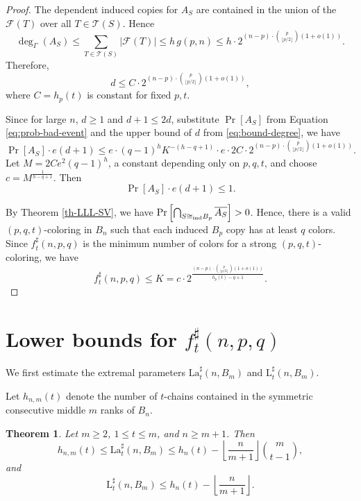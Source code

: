 \documentclass[twoside,12pt]{article}
\newcommand{\flr}[1]{\left\lfloor #1 \right\rfloor}
\newcommand{\floor}[1]{\flr{#1}}
\newtheorem{theorem}{Theorem}[section]
\newcommand{\LaT}{\mathrm{La}}
\newcommand{\LT}{\mathrm{L}}
\begin{document}
\begin{proof}
The dependent induced copies for $A_S$ are contained in the union of the \(\mathcal{F}(T)\) over all $T\in \mathcal T(S)$. Hence
\[
\operatorname{deg}_{\Gamma}(A_S)
\leq \sum_{T \in \mathcal{T}(S)} |\mathcal{F}(T)|
\leq h\, g(p,n)
\leq h \cdot 2^{(n - p) \cdot \binom{p}{\lfloor p/2 \rfloor}(1+o(1))}.
\]
Therefore,
\begin{equation}\label{eq:bound-degree}
d \leq C \cdot 2^{(n - p) \cdot \binom{p}{\lfloor p/2 \rfloor}(1+o(1))},
\end{equation}
where \(C = h_p(t)\) is constant for fixed \(p,t\).

Since for large \(n\), \(d \geq 1\) and \(d + 1 \leq 2d\), substitute \(\Pr[A_S]\) from Equation \eqref{eq:prob-bad-event} and the upper bound of \(d\) from \eqref{eq:bound-degree}, we have
$$
\Pr[A_S] \cdot e(d + 1)\leq e \cdot (q-1)^h K^{-(h - q + 1)} \cdot e \cdot 2 C \cdot 2^{(n - p) \cdot \binom{p}{\lfloor p/2 \rfloor}(1+o(1))}.
$$
Let \(M = 2 C e^2 (q-1)^h\), a constant depending only on \(p,q,t\), and choose \(c = M^{\frac{1}{h - q + 1}}\). Then
\[\Pr[A_S] \cdot e(d + 1) \leq 1.\]

By Theorem \ref{th-LLL-SV}, we have
\(\Pr\left[\bigcap_{S\cong_{\rm ind} B_p} \overline{A_S}\right] > 0\).
Hence, there is a valid $(p,q,t)$-coloring in $B_{n}$ such that each induced $B_{p}$ copy has at least $q$ colors.
Since \(f_t^\sharp(n,p,q)\) is the minimum number of colors for a strong $(p,q,t)$-coloring, we have
\[f_t^{\sharp}(n,p,q) \leq K=  c \cdot 2^{\frac{(n - p) \cdot \binom{p}{\lfloor p/2 \rfloor}(1+o(1))}{h_p(t) - q + 1}}. \]
\end{proof}
\section[Lower bounds]{Lower bounds for \texorpdfstring{$f_t^\sharp(n,p,q)$}{ftsharp(n,p,q)}}\label{sec4}

We first estimate the extremal parameters \(\LaT_t^\sharp(n,B_m)\) and \(\LT_t^\sharp(n,B_m)\).

Let $h_{n,m}(t)$ denote the number of $t$-chains contained in the symmetric consecutive middle $m$ ranks of $B_n$.

\begin{theorem}\label{th-Lat}
Let $m\ge2$, $1\le t\le m$, and $n\ge m+1$. Then
\[
h_{n,m}(t)
\le
\LaT_t^\sharp(n,B_m)
\le
h_n(t)-\floor{\frac{n}{m+1}}\binom{m}{t-1},
\]
and
\[
\LT_t^\sharp(n,B_m)
\le
h_n(t)-\floor{\frac{n}{m+1}}.
\]
\end{theorem}
\end{document}

